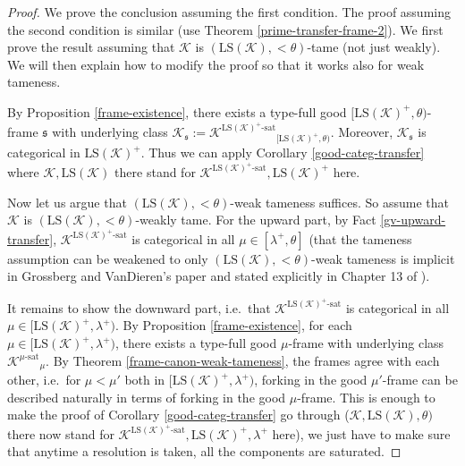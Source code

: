 \documentclass[12pt]{amsart}
\theoremstyle{definition}
\begin{document}
\begin{proof}
  We prove the conclusion assuming the first condition. The proof assuming the second condition is similar (use Theorem \ref{prime-transfer-frame-2}). We first prove the result assuming that ${\mathcal{K}}$ is $({\text{LS}} ({\mathcal{K}}), <\theta)$-tame (not just weakly). We will then explain how to modify the proof so that it works also for weak tameness.

  By Proposition \ref{frame-existence}, there exists a type-full good $[{\text{LS}} ({\mathcal{K}})^+, \theta)$-frame ${\mathfrak{s}}$ with underlying class ${\mathcal{K}}_{\mathfrak{s}} := {{{{\mathcal{K}}}^{{{{\text{LS}} ({\mathcal{K}})^+}}\text{-sat}}}}_{[{\text{LS}} ({\mathcal{K}})^+, \theta)}$. Moreover, ${\mathcal{K}}_{\mathfrak{s}}$ is categorical in ${\text{LS}} ({\mathcal{K}})^+$. Thus we can apply Corollary \ref{good-categ-transfer} where ${\mathcal{K}}, {\text{LS}} ({\mathcal{K}})$ there stand for ${{{{\mathcal{K}}}^{{{{\text{LS}} ({\mathcal{K}})^+}}\text{-sat}}}}, {\text{LS}} ({\mathcal{K}})^+$ here.

  Now let us argue that $({\text{LS}} ({\mathcal{K}}), <\theta)$-weak tameness suffices. So assume that ${\mathcal{K}}$ is $({\text{LS}} ({\mathcal{K}}), <\theta)$-weakly tame. For the upward part, by Fact \ref{gv-upward-transfer}, ${{{{\mathcal{K}}}^{{{{\text{LS}} ({\mathcal{K}})^+}}\text{-sat}}}}$ is categorical in all $\mu \in [\lambda^+, \theta]$ (that the tameness assumption can be weakened to only $({\text{LS}} ({\mathcal{K}}), <\theta)$-weak tameness is implicit in Grossberg and VanDieren's paper and stated explicitly in Chapter 13 of \cite{baldwinbook09}). 

  It remains to show the downward part, i.e.\ that ${{{{\mathcal{K}}}^{{{{\text{LS}} ({\mathcal{K}})^+}}\text{-sat}}}}$ is categorical in all $\mu \in [{\text{LS}} ({\mathcal{K}})^+, \lambda^+)$. By Proposition \ref{frame-existence}, for each $\mu \in [{\text{LS}} ({\mathcal{K}})^+, \lambda^+)$, there exists a type-full good $\mu$-frame with underlying class ${{{{\mathcal{K}}}^{{{\mu}}\text{-sat}}}}_\mu$. By Theorem \ref{frame-canon-weak-tameness}, the frames agree with each other, i.e.\ for $\mu < \mu'$ both in $[{\text{LS}} ({\mathcal{K}})^+, \lambda^+)$, forking in the good $\mu'$-frame can be described naturally in terms of forking in the good $\mu$-frame. This is enough to make the proof of Corollary \ref{good-categ-transfer} go through (${\mathcal{K}}, {\text{LS}} ({\mathcal{K}}), \theta)$ there now stand for ${{{{\mathcal{K}}}^{{{{\text{LS}} ({\mathcal{K}})^+}}\text{-sat}}}}, {\text{LS}} ({\mathcal{K}})^+, \lambda^+$ here), we just have to make sure that anytime a resolution is taken, all the components are saturated.
\end{proof}
\end{document}

